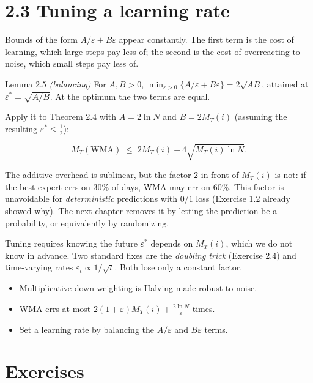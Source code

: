 \documentclass[11pt,a4paper,openany]{book}
\newcommand{\eps}{\varepsilon}
\begin{document}
\section*{2.3 Tuning a learning rate}\label{ch2-tune}

Bounds of the form $A/\eps+B\eps$ appear constantly. The first term is the cost of learning, which large steps pay less of; the second is the cost of overreacting to noise, which small steps pay less of.

\begin{bthm}{Lemma 2.5 \emph{(balancing)}}
For $A,B>0$, $\min_{\eps>0}\{A/\eps+B\eps\}=2\sqrt{AB}$, attained at $\eps^*=\sqrt{A/B}$. At the optimum the two terms are equal.
\end{bthm}

Apply it to Theorem 2.4 with $A=2\ln N$ and $B=2M_T(i)$ (assuming the resulting $\eps^*\le\tfrac12$):

\[M_T(\mathrm{WMA})\;\le\;2M_T(i)+4\sqrt{M_T(i)\ln N}.\]

The additive overhead is sublinear, but the factor $2$ in front of $M_T(i)$ is not: if the best expert errs on 30\% of days, WMA may err on 60\%. This factor is unavoidable for \emph{deterministic} predictions with $0/1$ loss (Exercise 1.2 already showed why). The next chapter removes it by letting the prediction be a probability, or equivalently by randomizing.

\begin{bwarn}{Tuning requires knowing the future}
$\eps^*$ depends on $M_T(i)$, which we do not know in advance. Two standard fixes are the \emph{doubling trick} (Exercise 2.4) and time-varying rates $\eps_t\propto1/\sqrt t$. Both lose only a constant factor.
\end{bwarn}

\begin{takeaways}
\begin{itemize}
\item Multiplicative down-weighting is Halving made robust to noise.
\item WMA errs at most $2(1+\eps)M_T(i)+\frac{2\ln N}{\eps}$ times.
\item Set a learning rate by balancing the $A/\eps$ and $B\eps$ terms.
\end{itemize}
\end{takeaways}

\section*{Exercises}\label{ch2-ex}
\end{document}
